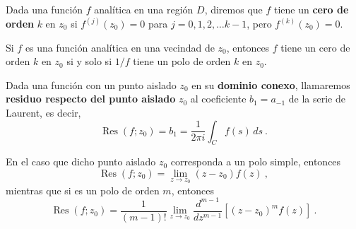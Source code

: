 \begin{defi}
    Dada una función $f$ analítica en una región $D$, diremos que $f$ tiene un \textbf{cero de orden} $k$ en $z_0$ si $f^{(j)}(z_0) = 0$ para $j = 0, 1, 2, \dots k-1$, pero $f^{(k)}(z_0) = 0$.
\end{defi}

\begin{teorema}
    Si $f$ es una función analítica en una vecindad de $z_0$, entonces $f$ tiene un cero de orden $k$ en $z_0$ si y solo si $1/f$ tiene un polo de orden $k$ en $z_0$.
\end{teorema}

\begin{defi}
    Dada una función con un punto aislado $z_0$ en su \textbf{dominio conexo}, llamaremos \textbf{residuo respecto del punto aislado} $z_0$ al coeficiente $b_1 = a_{-1}$ de la serie de Laurent, es decir,
    \begin{equation}
        \operatorname{Res}(f; z_0) = b_1 = \frac{1}{2\pi i} \int_C f(s) \, ds  \ .
    \end{equation}

    En el caso que dicho punto aislado $z_0$ corresponda a un polo simple, entonces 
    \begin{equation}
        \operatorname{Res}(f; z_0) = \lim_{z \to z_0}(z-z_0) f(z) \ ,
    \end{equation}
    mientras que si es un polo de orden $m$, entonces
    \begin{equation}
        \operatorname{Res}(f; z_0) = \frac{1}{(m-1)!} \lim_{z \to z_0} \frac{d^{m-1}}{dz^{m-1}} \left[(z-z_0)^m f(z)\right] \ .
    \end{equation}
\end{defi}

